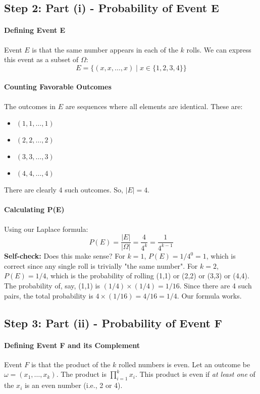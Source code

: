 \documentclass[11pt,a4paper]{article}
\begin{document}
\subsection{Step 2: Part (i) - Probability of Event E}

\paragraph{Defining Event E}
Event $E$ is that the same number appears in each of the $k$ rolls. We can express this event as a subset of $\Omega$:
\[
E = \{ (x, x, \dots, x) \mid x \in \{1, 2, 3, 4\} \}
\]
\paragraph{Counting Favorable Outcomes}
The outcomes in $E$ are sequences where all elements are identical. These are:
\begin{itemize}
    \item $(1, 1, \dots, 1)$
    \item $(2, 2, \dots, 2)$
    \item $(3, 3, \dots, 3)$
    \item $(4, 4, \dots, 4)$
\end{itemize}
There are clearly 4 such outcomes. So, $|E| = 4$.

\paragraph{Calculating P(E)}
Using our Laplace formula:
\[
P(E) = \frac{|E|}{|\Omega|} = \frac{4}{4^k} = \frac{1}{4^{k-1}}
\]
\textbf{Self-check:} Does this make sense? For $k=1$, $P(E) = 1/4^0 = 1$, which is correct since any single roll is trivially "the same number". For $k=2$, $P(E) = 1/4$, which is the probability of rolling (1,1) or (2,2) or (3,3) or (4,4). The probability of, say, (1,1) is $(1/4) \times (1/4) = 1/16$. Since there are 4 such pairs, the total probability is $4 \times (1/16) = 4/16 = 1/4$. Our formula works.

\subsection{Step 3: Part (ii) - Probability of Event F}

\paragraph{Defining Event F and its Complement}
Event $F$ is that the product of the $k$ rolled numbers is even. Let an outcome be $\omega = (x_1, \dots, x_k)$. The product is $\prod_{i=1}^k x_i$. This product is even if \textit{at least one} of the $x_i$ is an even number (i.e., 2 or 4).
\end{document}
